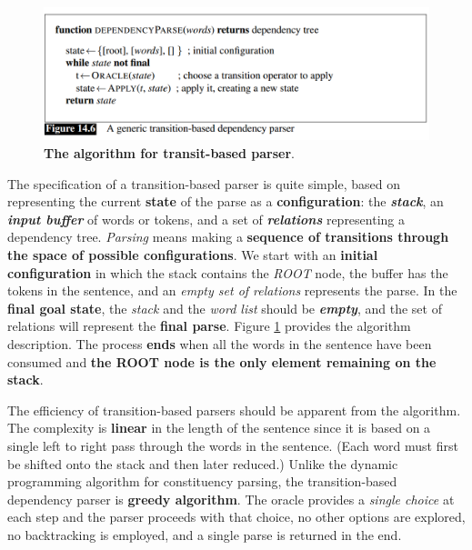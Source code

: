 \documentclass[11pt]{article}
\begin{document}
\begin{figure}
\begin{minipage}[t]{1\linewidth}
  \centering
  \centerline{\includegraphics[scale = 0.4]{transit_based_parser.png}}
\end{minipage}
\caption{\footnotesize{\textbf{The algorithm for transit-based parser}.}}
\label{fig: transit_based_parser}
\end{figure}

The specification of a transition-based parser is quite simple, based on representing the current \textbf{state} of the parse as a \textbf{configuration}: the \emph{\textbf{stack}}, an \emph{\textbf{input buffer}} of words or tokens, and a set of \textbf{\emph{relations}} representing a dependency tree. \emph{Parsing}
means making a \textbf{sequence of transitions through the space of possible configurations}. We start with an \textbf{initial configuration} in which the stack contains the \emph{ROOT} node, the buffer has the tokens in the sentence, and an \emph{empty set of relations} represents the parse. In the \textbf{final goal state}, the \emph{stack} and the \emph{word list} should be \emph{\textbf{empty}}, and the set of relations will represent the \textbf{final parse}. Figure \ref{fig: transit_based_parser} provides the algorithm description.  The process \textbf{ends} when all the words in the sentence have been consumed and \textbf{the ROOT node is the only element remaining on the stack}.

The efficiency of transition-based parsers should be apparent from the algorithm. The complexity is \textbf{linear} in the length of the sentence since it is based on a single
left to right pass through the words in the sentence. (Each word must first be shifted onto the stack and then later reduced.) Unlike the dynamic programming algorithm for constituency parsing, the transition-based dependency parser is \textbf{greedy algorithm}.  The oracle provides a \emph{single choice} at each step and the parser proceeds with that choice, no other options are explored, no backtracking is employed, and a single parse is returned in the end.
\end{document}
